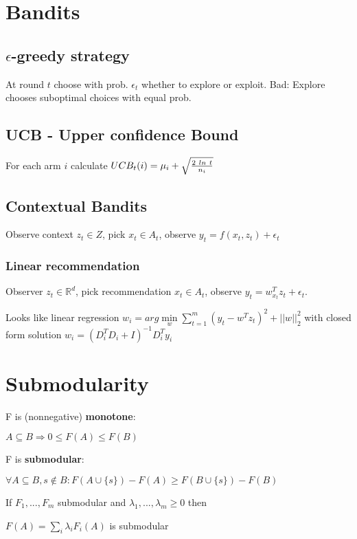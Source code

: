\documentclass[a4paper,11pt,twocolumn]{article}
\begin{document}
\section{Bandits}

\subsection{$\epsilon$-greedy strategy}
At round $t$ choose with prob. $\epsilon_t$ whether to explore or exploit. Bad: Explore chooses suboptimal choices with equal prob.

\subsection{UCB - Upper confidence Bound}
For each arm $i$ calculate $UCB_t(i) = 
\mu_i + 
\sqrt{{2~ln~t} \over n_i}$	

\subsection{Contextual Bandits}
Observe context $z_t \in Z$, pick $x_t \in A_t$, observe $y_t = f(x_t, z_t) + \epsilon_t$

\subsubsection{Linear recommendation}
Observer $z_t \in \mathbb{R}^d$, pick recommendation $x_t \in A_t$, observe $y_t = w_{x_t}^T z_t + \epsilon_t$.

Looks like linear regression 
$w_i = arg \min \limits_w \sum \limits_{t=1}^m (y_t - w^T z_t)^2 + ||w||_2^2$ 
with closed form solution $w_i = (D_i^T D_i + I)^{-1} D_i^T y_i$

\section{Submodularity}

F is (nonnegative) \textbf{monotone}: 

$A \subseteq B \Rightarrow 0 \leq F(A)  \leq F(B)$


F is \textbf{submodular}: 

$\forall A \subseteq B, s \notin B:  F(A \cup \lbrace s  \rbrace) - F(A) \geq F(B \cup \lbrace s \rbrace ) - F(B)$



If $F_1,...,F_m$ submodular and $\lambda_1,...,\lambda_m \geq 0 $ then

$F(A) = \sum_i \lambda_i F_i(A)$ is submodular 
\end{document}
